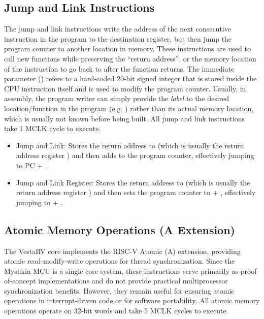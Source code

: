 \documentclass[11pt,pdftex,portrait,letterpaper]{article}
\begin{document}
\subsection{Jump and Link Instructions}

The jump and link instructions write the address of the next consecutive instruction in the program to the destination register, but then jump the program counter to another location in memory. These instructions are used to call new functions while preserving the ``return address'', or the memory location of the instruction to go back to after the function returns. The immediate parameter () refers to a hard-coded 20-bit signed integer that is stored inside the CPU instruction itself and is used to modify the program counter. Usually, in assembly, the program writer can simply provide the \textit{label} to the desired location/function in the program (e.g. ) rather than its actual memory location, which is usually not known before being built. All jump and link instructions take 1 MCLK cycle to execute.

\begin{itemize}
	\item Jump and Link:  Stores the return address to  (which is usually the return address register ) and then adds  to the program counter, effectively jumping to PC + . 
	\item Jump and Link Register:  Stores the return address to  (which is usually the return address register ) and then sets the program counter to  + , effectively jumping to  + .
\end{itemize}



\subsection{Atomic Memory Operations (A Extension)}

The VestaRV core implements the RISC-V Atomic (A) extension, providing atomic read-modify-write operations for thread synchronization. Since the Myshkin MCU is a single-core system, these instructions serve primarily as proof-of-concept implementations and do not provide practical multiprocessor synchronization benefits. However, they remain useful for ensuring atomic operations in interrupt-driven code or for software portability. All atomic memory operations operate on 32-bit words and take 5 MCLK cycles to execute.
\end{document}
